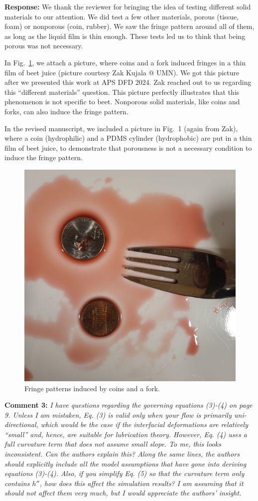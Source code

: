 \documentclass[11pt]{article}
\newif\ifhighlight
\newcommand{\hl}[1]{\ifhighlight\textcolor{blue}{#1}\else#1\fi}
\begin{document}
\textbf{Response:} We thank the reviewer for bringing the idea of testing different solid materials to our attention. We did test a few other materials, porous (tissue, foam) or nonporous (coin, rubber). We saw the fringe pattern around all of them, as long as the liquid film is thin enough. These tests led us to think that being porous was not necessary. 

In Fig.~\ref{fig:coin-fork}, we attach a picture, where coins and a fork induced fringes in a thin film of beet juice (picture courtesy Zak Kujala @ UMN). 
We got this picture after we presented this work at APS DFD 2024. 
Zak reached out to us regarding this “different materials” question. 
This picture perfectly illustrates that this phenomenon is not specific to beet. Nonporous solid materials, like coins and forks, can also induce the fringe pattern. 

\hl{
In the revised manuscript, we included a picture in Fig.~1 (again from Zak), where a coin (hydrophilic) and a PDMS cylinder (hydrophobic) are put in a thin film of beet juice, to demonstrate that porousness is not a necessary condition to induce the fringe pattern.
}

\begin{figure}[ht]
    \centering
    \includegraphics[width=0.5\linewidth]{coin_fork.png}
    \caption{Fringe patterns induced by coins and a fork.}
    \label{fig:coin-fork}
\end{figure}

\bigskip
\begin{siderules}
\textbf{Comment 3:} \textit{
I have questions regarding the governing equations (3)-(4) on page 9. 
Unless I am mistaken, Eq. (3) is valid only when your flow is primarily uni-directional, which would be the case if the interfacial deformations are relatively “small” and, hence, are suitable for lubrication theory. 
However, Eq. (4) uses a full curvature term that does not assume small slope. 
To me, this looks inconsistent. 
Can the authors explain this? 
Along the same lines, the authors should explicitly include all the model assumptions that have gone into deriving equations (3)-(4). 
Also, if you simplify Eq. (5) so that the curvature term only contains $h''$, how does this affect the simulation results? 
I am assuming that it should not affect them very much, but I would appreciate the authors’ insight.}
\end{siderules}
\end{document}
